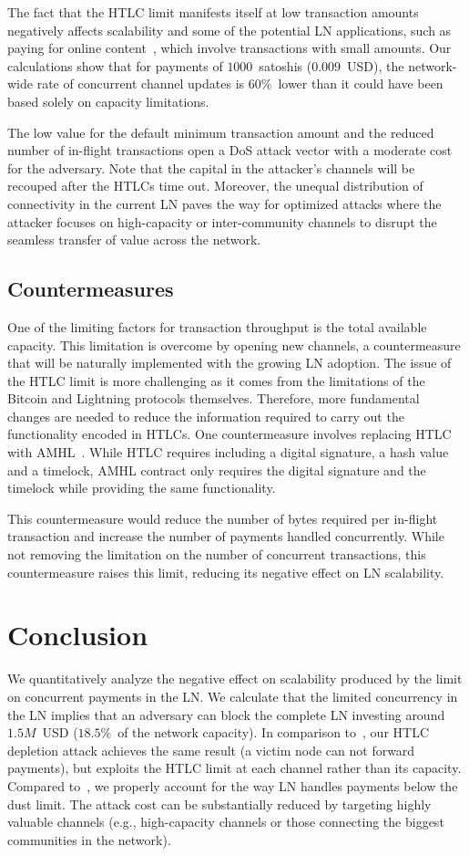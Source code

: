 The fact that the HTLC limit manifests itself at low transaction amounts negatively affects scalability and some of the potential LN applications, such as paying for online content~\cite{Poon2016}, which involve transactions with small amounts. 
Our calculations show that for payments of $1000$~satoshis ($0.009$~USD), the network-wide rate of concurrent channel updates is $60\%$~lower than it could have been based solely on capacity limitations.

The low value for the default minimum transaction amount and the reduced number of in-flight transactions open a DoS attack vector with a moderate cost for the adversary.
Note that the capital in the attacker's channels will be recouped after the HTLCs time out.
Moreover, the unequal distribution of connectivity in the current LN paves the way for optimized attacks where the attacker focuses on high-capacity or inter-community channels to disrupt the seamless transfer of value across the network.


\subsection{Countermeasures}
One of the limiting factors for transaction throughput is the total available capacity.
This limitation is overcome by opening new channels, a countermeasure that will be naturally implemented with the growing LN adoption.
The issue of the HTLC limit is more challenging as it comes from the limitations of the Bitcoin and Lightning protocols themselves.
Therefore, more fundamental changes are needed to reduce the information required to carry out the functionality encoded in HTLCs.
One countermeasure involves replacing HTLC with AMHL~\cite{Malavolta2019}.
While HTLC requires including a digital signature, a hash value and a timelock, AMHL contract only requires the digital signature and the timelock while providing the same functionality.

This countermeasure would reduce the number of bytes required per in-flight transaction and increase the number of payments handled concurrently.
While not removing the limitation on the number of concurrent transactions, this countermeasure raises this limit, reducing its negative effect on LN scalability.


\section{Conclusion}

We quantitatively analyze the negative effect on scalability produced by the limit on concurrent payments in the LN.
We calculate that the limited concurrency in the LN implies that an adversary can block the complete LN investing around $1.5M$~USD ($18.5\%$~of the network capacity).
In comparison to~\cite{PerezSola2019}, our HTLC depletion attack achieves the same result (a victim node can not forward payments), but exploits the HTLC limit at each channel rather than its capacity.
Compared to~\cite{Mizrahi2020}, we properly account for the way LN handles payments below the dust limit.
The attack cost can be substantially reduced by targeting highly valuable channels (e.g., high-capacity channels or those connecting the biggest communities in the network).